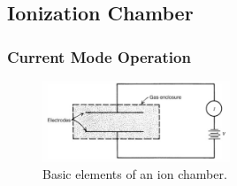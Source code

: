 \subsection{Ionization Chamber}
\subsubsection{Current Mode Operation}
\begin{figure}[ht]
    \centering
    \includegraphics[width=0.5\textwidth]{images/ion_chamber_current_mode.png}
    \caption{Basic elements of an ion chamber.}
    \label{fig:ion_chamber_current_mode}
\end{figure}
